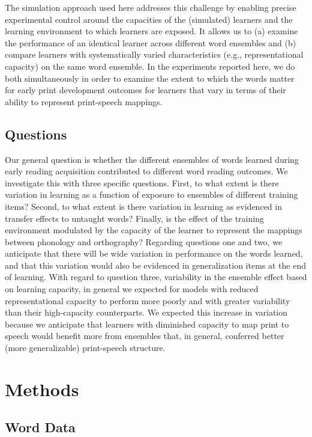 \documentclass[
  ,man,floatsintext]{apa6}
\begin{document}
The simulation approach used here addresses this challenge by enabling precise experimental control around the capacities of the (simulated) learners and the learning environment to which learners are exposed. It allows us to (a) examine the performance of an identical learner across different word ensembles and (b) compare learners with systematically varied characteristics (e.g., representational capacity) on the same word ensemble. In the experiments reported here, we do both simultaneously in order to examine the extent to which the words matter for early print development outcomes for learners that vary in terms of their ability to represent print-speech mappings.

\subsection{Questions}\label{questions}

Our general question is whether the different ensembles of words learned during early reading acquisition contributed to different word reading outcomes. We investigate this with three specific questions. First, to what extent is there variation in learning as a function of exposure to ensembles of different training items? Second, to what extent is there variation in learning as evidenced in transfer effects to untaught words? Finally, is the effect of the training environment modulated by the capacity of the learner to represent the mappings between phonology and orthography?
Regarding questions one and two, we anticipate that there will be wide variation in performance on the words learned, and that this variation would also be evidenced in generalization items at the end of learning. With regard to question three, variability in the ensemble effect based on learning capacity, in general we expected for models with reduced representational capacity to perform more poorly and with greater variability than their high-capacity counterparts. We expected this increase in variation because we anticipate that learners with diminished capacity to map print to speech would benefit more from ensembles that, in general, conferred better (more generalizable) print-speech structure.

\section{Methods}\label{methods}

\subsection{Word Data}\label{word-data}
\end{document}
